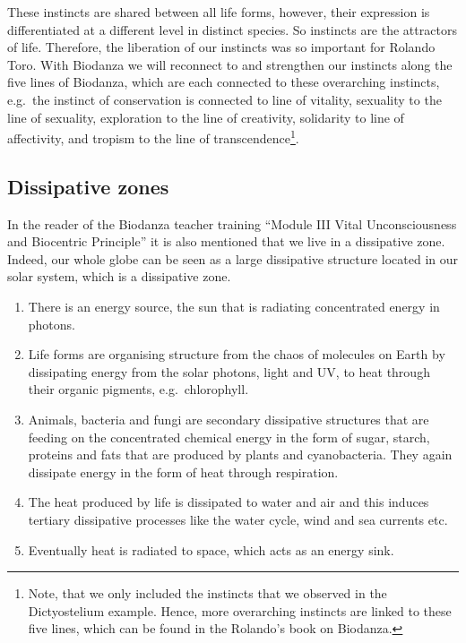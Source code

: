 \documentclass[
  11pt,
]{book}
\begin{document}
These instincts are shared between all life forms, however, their expression is differentiated at a different level in distinct species. So instincts are the attractors of life. Therefore, the liberation of our instincts was so important for Rolando Toro. With Biodanza we will reconnect to and strengthen our instincts along the five lines of Biodanza, which are each connected to these overarching instincts, e.g.~the instinct of conservation is connected to line of vitality, sexuality to the line of sexuality, exploration to the line of creativity, solidarity to line of affectivity, and tropism to the line of transcendence\footnote{Note, that we only included the instincts that we observed in the Dictyostelium example. Hence, more overarching instincts are linked to these five lines, which can be found in the Rolando's book on Biodanza.}.

\hypertarget{dissipative-zones}{%
\subsection{Dissipative zones}\label{dissipative-zones}}

In the reader of the Biodanza teacher training ``Module III Vital Unconsciousness and Biocentric Principle'' it is also mentioned that we live in a dissipative zone. Indeed, our whole globe can be seen as a large dissipative structure located in our solar system, which is a dissipative zone.

\begin{enumerate}
\def\labelenumi{\arabic{enumi}.}
\item
  There is an energy source, the sun that is radiating concentrated energy in photons.
\item
  Life forms are organising structure from the chaos of molecules on Earth by dissipating energy from the solar photons, light and UV, to heat through their organic pigments, e.g.~chlorophyll.
\item
  Animals, bacteria and fungi are secondary dissipative structures that are feeding on the concentrated chemical energy in the form of sugar, starch, proteins and fats that are produced by plants and cyanobacteria. They again dissipate energy in the form of heat through respiration.
\item
  The heat produced by life is dissipated to water and air and this induces tertiary dissipative processes like the water cycle, wind and sea currents etc.
\item
  Eventually heat is radiated to space, which acts as an energy sink.
\end{enumerate}
\end{document}
